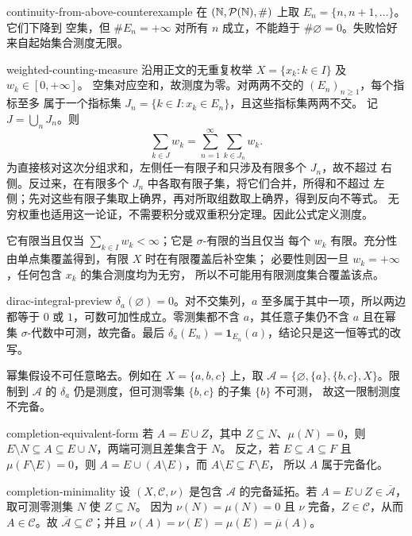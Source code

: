 \begin{solution}{continuity-from-above-counterexample}
在 $(\mathbb{N},\mathcal P(\mathbb{N}),\#)$ 上取 $E_n=\{n,n+1,\ldots\}$。它们下降到
空集，但 $\#E_n=+\infty$ 对所有 $n$ 成立，不能趋于
$\#\varnothing=0$。失败恰好来自起始集合测度无限。
\end{solution}

\begin{solution}{weighted-counting-measure}
沿用正文的无重复枚举 $X=\{x_k:k\in I\}$ 及 $w_k\in[0,+\infty]$。
空集对应空和，故测度为零。对两两不交的 $(E_n)_{n\ge1}$，每个指标至多
属于一个指标集 $J_n=\{k\in I:x_k\in E_n\}$，且这些指标集两两不交。
记 $J=\bigcup_nJ_n$。则
\[
 \sum_{k\in J}w_k=\sum_{n=1}^{\infty}\sum_{k\in J_n}w_k.
\]
为直接核对这次分组求和，左侧任一有限子和只涉及有限多个 $J_n$，故不超过
右侧。反过来，在有限多个 $J_n$ 中各取有限子集，将它们合并，所得和不超过
左侧；先对这些有限子集取上确界，再对所取组数取上确界，得到反向不等式。
无穷权重也适用这一论证，不需要积分或双重积分定理。因此公式定义测度。

它有限当且仅当 $\sum_{k\in I}w_k<\infty$；它是 $\sigma$-有限的当且仅当
每个 $w_k$ 有限。充分性由单点集覆盖得到，有限 $X$ 时在有限覆盖后补空集；
必要性则因一旦 $w_k=+\infty$，任何包含 $x_k$ 的集合测度均为无穷，
所以不可能用有限测度集合覆盖该点。
\end{solution}

\begin{solution}{dirac-integral-preview}
$\delta_a(\varnothing)=0$。对不交集列，$a$ 至多属于其中一项，所以两边
都等于 $0$ 或 $1$，可数可加性成立。零测集都不含 $a$，其任意子集仍不含
$a$ 且在幂集 $\sigma$-代数中可测，故完备。最后
$\delta_a(E_n)=\mathbf1_{E_n}(a)$，结论只是这一恒等式的改写。

幂集假设不可任意略去。例如在 $X=\{a,b,c\}$ 上，取
$\mathcal A=\{\varnothing,\{a\},\{b,c\},X\}$。限制到 $\mathcal A$
的 $\delta_a$ 仍是测度，但可测零集 $\{b,c\}$ 的子集 $\{b\}$ 不可测，
故这一限制测度不完备。
\end{solution}

\begin{solution}{completion-equivalent-form}
若 $A=E\cup Z$，其中 $Z\subseteq N$、$\mu(N)=0$，则
$E\setminus N\subseteq A\subseteq E\cup N$，两端可测且差集含于 $N$。
反之，若 $E\subseteq A\subseteq F$ 且 $\mu(F\setminus E)=0$，则
$A=E\cup(A\setminus E)$，而 $A\setminus E\subseteq F\setminus E$，
所以 $A$ 属于完备化。
\end{solution}

\begin{solution}{completion-minimality}
设 $(X,\mathcal C,\nu)$ 是包含 $\mathcal A$ 的完备延拓。若
$A=E\cup Z\in\overline{\mathcal A}$，取可测零测集 $N$ 使 $Z\subseteq N$。
因为 $\nu(N)=\mu(N)=0$ 且 $\nu$ 完备，$Z\in\mathcal C$，从而
$A\in\mathcal C$。故 $\overline{\mathcal A}\subseteq\mathcal C$；并且
$\nu(A)=\nu(E)=\mu(E)=\overline\mu(A)$。
\end{solution}

